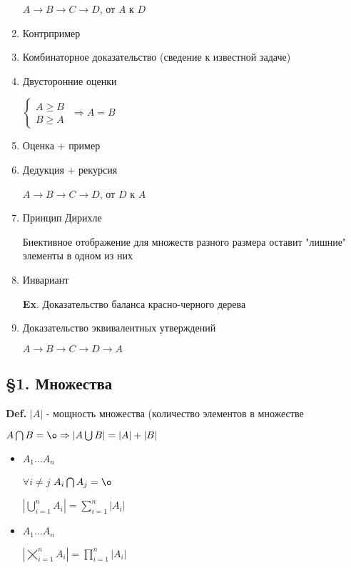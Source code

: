 \documentclass[14pt, letter paper]{article}
\begin{document}
\begin{enumerate}
    $A \rightarrow B \rightarrow C \rightarrow D$, от $A$ к $D$

    \item Контрпример

    \item Комбинаторное доказательство (сведение к известной задаче)

    \item Двусторонние оценки

    $\begin{cases}
        A \geq B \\
        B \geq A
    \end{cases}$
    $\Rightarrow A = B$

    \item Оценка + пример

    \item Дедукция + рекурсия

    $A \rightarrow B \rightarrow C \rightarrow D$, от $D$ к $A$

    \item Принцип Дирихле

    Биективное отображение для множеств разного размера оставит "лишние" элементы в одном из них

    \item Инвариант

    \textbf{Ex}. Доказательство баланса красно-черного дерева

    \item Доказательство эквивалентных утверждений

    $A \rightarrow B \rightarrow C \rightarrow D \rightarrow A$
\end{enumerate}

\begin{center}
    \subsection*{\S 1. Множества}
\end{center}

\textbf{Def.} $|A|$ - мощность множества (количество элементов в множестве

$A \bigcap B = \o \Rightarrow |A \bigcup B| = |A| + |B|$ 

\begin{itemize}
    \item $A_1 \ldots A_n$

    $\forall i \neq j$ $A_i \bigcap A_j = \o$

    $|\bigcup\limits_{i = 1}^{n} A_i| = \sum\limits_{i=1}^{n} |A_i|$

    \item $A_1 \ldots A_n$

    $|\bigtimes\limits_{i=1}^{n} A_i| = \prod\limits_{i=1}^{n} |A_i|$
\end{itemize}
\end{document}

